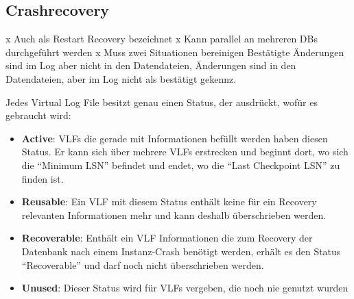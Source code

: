      \subsection{Crashrecovery}
        x Auch als Restart Recovery bezeichnet
        x Kann parallel an mehreren DBs durchgeführt werden
        x Muss zwei Situationen bereinigen
          Bestätigte Änderungen sind im Log aber nicht in den Datendateien,
          Änderungen sind in den Datendateien, aber im Log nicht als bestätigt
          gekennz.

                    Jedes Virtual Log File besitzt genau einen Status, der ausdrückt,
          wofür es gebraucht wird:
          \begin{itemize}
              \item \textbf{Active}: VLFs die gerade mit Informationen befüllt
              werden haben diesen Status. Er kann sich über mehrere VLFs
              erstrecken und beginnt dort, wo sich die \enquote{Minimum LSN}
              befindet und endet, wo die \enquote{Last Checkpoint LSN} zu
              finden ist.
              \item \textbf{Reusable}: Ein VLF mit diesem Status enthält keine
              für ein Recovery relevanten Informationen mehr und kann deshalb
              überschrieben werden.
              \item \textbf{Recoverable}: Enthält ein VLF Informationen die zum
              Recovery der Datenbank nach einem Instanz-Crash benötigt werden,
              erhält es den Status \enquote{Recoverable} und darf noch nicht
              überschrieben werden.
              \item \textbf{Unused}: Dieser Status wird für VLFs vergeben, die
              noch nie genutzt wurden
                    \end{itemize}